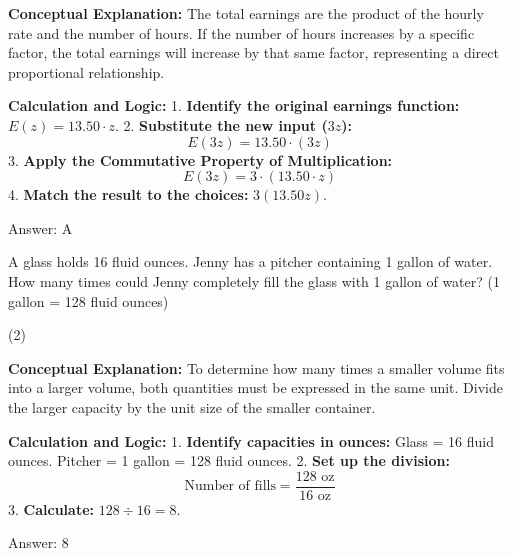 \documentclass[11pt,paper=a4,answers]{exam}
\begin{document}
\begin{questions}
\begin{solution}
\textbf{Conceptual Explanation:} 
The total earnings are the product of the hourly rate and the number of hours. If the number of hours increases by a specific factor, the total earnings will increase by that same factor, representing a direct proportional relationship.

\vspace{20pt}

\textbf{Calculation and Logic:} 
1. \textbf{Identify the original earnings function:} $E(z) = 13.50 \cdot z$. 
2. \textbf{Substitute the new input ($3z$):} 
\[ E(3z) = 13.50 \cdot (3z) \]
3. \textbf{Apply the Commutative Property of Multiplication:} 
\[ E(3z) = 3 \cdot (13.50 \cdot z) \]
4. \textbf{Match the result to the choices:} $3(13.50z)$.

\vspace{20pt}

Answer: \colorbox{yellow!100}{A}
\end{solution}

\vspace{60pt}

\question
A glass holds 16 fluid ounces. Jenny has a pitcher containing 1 gallon of water. How many times could Jenny completely fill the glass with 1 gallon of water? (1 gallon = 128 fluid ounces)
\begin{tasks}(2)
\end{tasks}

\begin{solution}
\textbf{Conceptual Explanation:} 
To determine how many times a smaller volume fits into a larger volume, both quantities must be expressed in the same unit. Divide the larger capacity by the unit size of the smaller container.

\vspace{30pt}

\textbf{Calculation and Logic:} 
1. \textbf{Identify capacities in ounces:} 
Glass = 16 fluid ounces. 
Pitcher = 1 gallon = 128 fluid ounces. 
2. \textbf{Set up the division:} 
\[ \text{Number of fills} = \frac{128 \text{ oz}}{16 \text{ oz}} \]
3. \textbf{Calculate:} 
$128 \div 16 = 8$.

\vspace{30pt}

Answer: \colorbox{yellow!100}{8}
\end{solution}


\end{questions}
\end{document}
